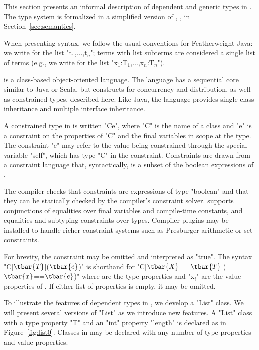 
This section presents an informal description of 
dependent and generic types in \Xten{}.  The type system is formalized
in a simplified version of \Xten{}, \FX{}, in
Section~\ref{sec:semantics}.

When presenting syntax, we follow the usual conventions for
Featherweight Java:
we write  for the list
\xcdmath"t$_1$,$\dots$,t$_n$"; 
terms with list subterms are considered 
a single list of terms (e.g., 
we write \Xcd{:} for the list
\xcdmath"x$_1$:T$_1$,$\dots$,x$_n$:T$_n$").

\Xten{} is a class-based object-oriented language.
The language has a sequential core similar to Java or Scala, but 
constructs
for concurrency and distribution, as well as constrained types,
described here.
Like Java, the language provides single class inheritance and
multiple interface inheritance.

A constrained type in \Xten{} is written \xcd"C{e}", where \xcd"C" is the
name of a class and \xcd"e" is a constraint on the properties of
\xcd"C" and the final variables in scope at the type.  The
constraint \xcd"e" may refer to the value being constrained
through the special variable \xcd"self", which has type \xcd"C"
in the constraint.  Constraints are drawn from a constraint
language that, syntactically, is a subset of the boolean
expressions of \Xten{}.

The compiler checks that constraints are expressions
of type \xcd"boolean" and that they can be statically checked by
the compiler's constraint solver.  
\Xten{} supports conjunctions of equalities
over final variables and compile-time constants, and equalities
and subtyping constraints over types.
Compiler plugins may be installed to
handle richer constraint systems such as Presburger arithmetic
or set constraints.

For brevity, the constraint may be omitted and
interpreted as \xcd"true".
The syntax
\xcdmath"C[$\tbar{T}$]($\tbar{e}$)" is shorthand for
\xcdmath"C[$\tbar{X}$==$\tbar{T}$]($\tbar{x}$==$\tbar{e}$)"
where  are the type properties and \xcdmath"x$_i$" are the
value properties of .
If either list of properties is empty, it may be omitted.

To illustrate the features of dependent types in \Xten{}, we develop a \xcd"List"
class.  We will present several versions of \xcd"List" as we
introduce new features.
A \xcd"List" class with a type property \xcd"T" and an \xcd"int"
property \xcd"length" is declared as in Figure~\ref{fig:list0}.
Classes in \Xten{} may be declared with any number of type properties and
value properties.


